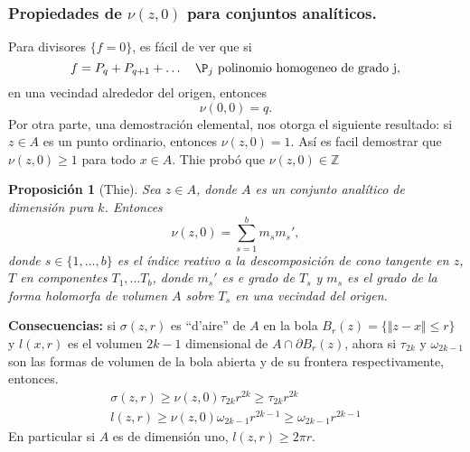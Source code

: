 \documentclass[letterpaper]{article}
\newtheorem{prop}[teorema]{Proposici\'on}
\newcommand{\zah}{\ensuremath{ \mathbb Z }}
\begin{document}
\subsubsection{Propiedades de \(\nu(z,0)\) para conjuntos analíticos.}
\label{sec:org81bac70}
Para divisores \(\{f=0\}\), es fácil de ver que si
\[
    f=P_q+P_{q+1}+\dots\quad\P_j\text{ polinomio homogeneo de grado j},
\]
\noindent en una vecindad alrededor del origen, entonces
\[
    \nu(0,0)=q.
\]
Por otra parte, una demostración elemental, nos otorga el siguiente resultado: si \(z\in A\) es un punto ordinario, entonces \(\nu(z,0)=1\). Así es facil demostrar que \(\nu(z,0)\geq1\) para todo \(x\in A\). Thie probó que \(\nu(z,0)\in\zah\)
\begin{prop}[Thie]\label{thie}
Sea \(z\in A\), donde \(A\) es un conjunto analítico de dimensión pura \(k\). Entonces
\[
    \nu(z,0)=\sum^{b}_{s=1}m_{s} m_{s}',
\]
\noindent donde \(s\in\{1,\dots,b\}\) es el índice reativo a la descomposición de cono tangente en \(z\), \(T\) en componentes \(T_1,\dots T_b\), donde \(m_s'\) es e grado de \(T_s\) y \(m_s\) es el grado de la forma holomorfa de volumen \(A\) sobre \(T_s\) en una vecindad del origen.
\end{prop}
\textbf{Consecuencias:}
si \(\sigma(z,r)\) es ``d'aire'' de \(A\) en la bola \(B_r(z)=\{\Vert z-x\Vert\leq r\}\) y \(l(x,r)\) es el volumen \(2k-1\) dimensional de \(A\cap\partial B_r(z)\), ahora si \(\tau_{2k}\) y \(\omega_{2k-1}\) son las formas de volumen de la bola abierta y de su frontera respectivamente, entonces.
\begin{align*}
\sigma(z,r)\geq\nu(z,0)\tau_{2k}r^{2k}\geq\tau_{2k}r^{2k}\\
l(z,r)\geq\nu(z,0)\omega_{2k-1}r^{2k-1}\geq\omega_{2k-1}r^{2k-1}
\end{align*}
\noindent En particular si \(A\) es de dimensión uno, \(l(z,r)\geq2\pi r\).
\end{document}
